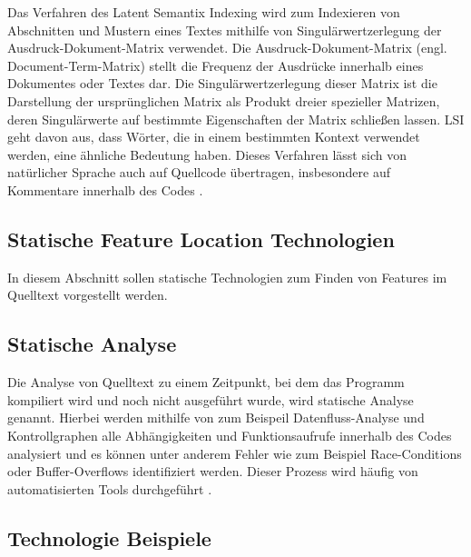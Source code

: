 \documentclass[runningheads,a4paper]{llncs}
\begin{document}
Das Verfahren des Latent Semantix Indexing wird zum Indexieren von Abschnitten und Mustern eines Textes mithilfe von Singulärwertzerlegung der Ausdruck-Dokument-Matrix verwendet. Die Ausdruck-Dokument-Matrix (engl. Document-Term-Matrix) stellt die Frequenz der Ausdrücke innerhalb eines Dokumentes oder Textes dar. Die Singulärwertzerlegung dieser Matrix ist die Darstellung der ursprünglichen Matrix als Produkt dreier spezieller Matrizen, deren Singulärwerte auf bestimmte Eigenschaften der Matrix schließen lassen. LSI geht davon aus, dass Wörter, die in einem bestimmten Kontext verwendet werden, eine ähnliche Bedeutung haben. Dieses Verfahren lässt sich von natürlicher Sprache auch auf Quellcode übertragen, insbesondere auf Kommentare innerhalb des Codes \cite{LSI}.




\subsection{Statische Feature Location Technologien}

In diesem Abschnitt sollen statische Technologien zum Finden von Features im Quelltext vorgestellt werden.

\subsection*{Statische Analyse}

Die Analyse von Quelltext zu einem Zeitpunkt, bei dem das Programm kompiliert wird und noch nicht ausgeführt wurde, wird statische Analyse genannt. Hierbei werden mithilfe von zum Beispeil Datenfluss-Analyse und Kontrollgraphen alle Abhängigkeiten und Funktionsaufrufe innerhalb des Codes analysiert und es können unter anderem Fehler wie zum Beispiel Race-Conditions oder Buffer-Overflows identifiziert werden. Dieser Prozess wird häufig von automatisierten Tools durchgeführt \cite{static}.

\subsection*{Technologie Beispiele}
\end{document}
